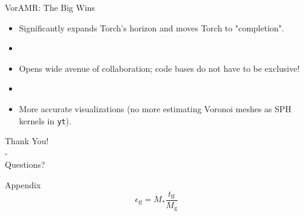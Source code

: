 \documentclass[aspectratio=169]{beamer}
\begin{document}
\begin{frame}{VorAMR: The Big Wins}{}
    \begin{itemize}
    	\item Significantly expands Torch's horizon and moves Torch to "completion".
	\item []
    	\item Opens wide avenue of collaboration; code bases do not have to be exclusive! 
	\item []
	\item More accurate visualizations (no more estimating Voronoi meshes as SPH kernels in \texttt{yt}).
    \end{itemize}
\end{frame}
%
%
%
%
%
\begin{frame}{}
	\centering Thank You! \\ - \\ Questions?
\end{frame}

\begin{frame}{Appendix}
	\begin{equation}\label{eqn:sfe}
		\epsilon_{\text{ff}} = \dot{M}_{*}\frac{t_{\text{ff}}}{M_{\text{g}}}
	\end{equation}
\end{frame}
\end{document}
